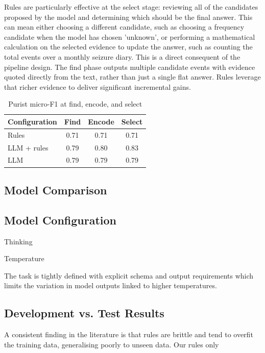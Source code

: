 \documentclass[conference]{IEEEtran}
\begin{document}
Rules are particularly effective at the select stage: 
reviewing all of the candidates proposed by the model
and determining which should be the final answer. 
This can mean either choosing a different candidate, 
such as choosing a frequency candidate when the model 
has chosen 'unknown', or performing a mathematical 
calculation on the selected evidence to update the answer,
such as counting the total events over a monthly seizure 
diary. This is a direct consequent of the pipeline design. 
The find phase outputs multiple candidate events with 
evidence quoted directly from the text, rather than just a 
single flat answer. Rules leverage that richer evidence to 
deliver significant incremental gains.

\begin{table}[!t]
\caption{Purist micro-F1 at find, encode, and select}
\label{tab:stages}
\centering
\begin{tabularx}{\linewidth}{Yccc}
\toprule
\textbf{Configuration} &
\textbf{Find} &
\textbf{Encode} &
\textbf{Select} \\
\midrule
Rules & 0.71 & 0.71 & 0.71 \\
LLM + rules & 0.79 & 0.80 & 0.83 \\
LLM & 0.79 & 0.79 & 0.79 \\
\bottomrule
\end{tabularx}
\end{table}

\subsection{Model Comparison}

\subsection{Model Configuration}

Thinking 

Temperature

The task is tightly defined with explicit schema and output 
requirements which limits the variation in model outputs 
linked to higher temperatures.

\subsection{Development vs. Test Results}

A consistent finding in the literature is that rules are brittle
and tend to overfit the training data, generalising poorly
to unseen data. Our rules only 
\end{document}
